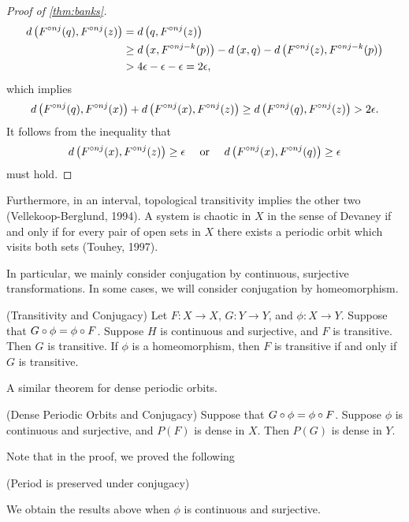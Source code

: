\documentclass[12pt,draft,twoside]{book}
\begin{document}
\begin{proof}[Proof of \ref{thm:banks}]
\begin{align*}
    d\left( F^{\circ nj}(q), F^{\circ nj}(z) \right) 
    &= d\left( q, F^{\circ nj}(z) \right)  \\
    &\geq  d\left( x, F^{\circ nj-k}(p) \right) - d\left( x,q \right) - d\left( F^{\circ nj}(z), F^{\circ nj - k}(p) \right)  \\
    &> 4\epsilon - \epsilon - \epsilon 
    = 2\epsilon,
  \end{align*}
  which implies
  \begin{equation*}
    d\left( F^{\circ nj}(q), F^{\circ nj}(x) \right) + d\left( F^{\circ nj}(x), F^{\circ nj}(z) \right) 
    \geq d\left( F^{\circ nj}(q), F^{\circ nj}(z) \right)
    > 2\epsilon.
  \end{equation*}
  It follows from the inequality that 
  \begin{equation*}
    d\left( F^{\circ nj}(x), F^{\circ nj}(z) \right) \geq \epsilon \quad\mbox{ or }\quad d\left( F^{\circ nj}(x), F^{\circ nj}(q) \right) \geq \epsilon 
  \end{equation*}
   must hold.

\end{proof}

Furthermore, in an interval, topological transitivity implies the other two (Vellekoop-Berglund, 1994).
A system is chaotic in $X$ in the sense of Devaney if and only if for every pair of open sets in $X$ there exists a periodic orbit which visits both sets (Touhey, 1997).

In particular, we mainly consider conjugation by continuous, surjective transformations.
In some cases, we will consider conjugation by homeomorphism.
\begin{theorem}
  (Transitivity and Conjugacy) 
  Let $F: X \to X$, $G: Y \to Y$, and $\phi: X \to Y$.
  Suppose that $G \circ \phi = \phi \circ F$.
  Suppose $H$ is continuous and surjective, and $F$ is transitive.
  Then $G$ is transitive.
  If $\phi$ is a homeomorphism, then $F$ is transitive if and only if $G$ is transitive.
\end{theorem}
A similar theorem for dense periodic orbits.
\begin{theorem}
  (Dense Periodic Orbits and Conjugacy) 
  Suppose that $G \circ \phi = \phi \circ F$.
  Suppose $\phi$ is continuous and surjective, and $P(F)$ is dense in $X$.
  Then $P(G)$ is dense in $Y$.
\end{theorem}
Note that in the proof, we proved the following
\begin{corollary}
  (Period is preserved under conjugacy)
\end{corollary}
We obtain the results above when $\phi$ is continuous and surjective.




\printindex
\end{document}
